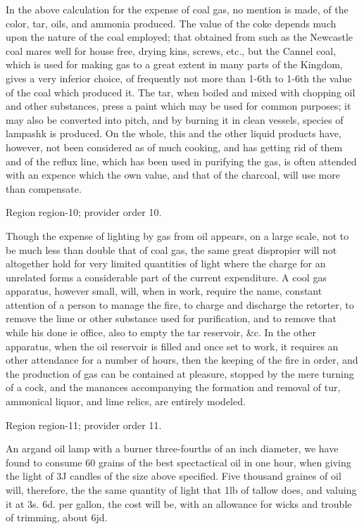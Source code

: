 \documentclass[11pt]{article}
\begin{document}
In the above calculation for the expense of coal gas, no mention is made, of the color, tar, oils, and ammonia produced. The value of the coke depends much upon the nature of the coal employed; that obtained from such as the Newcastle coal mares well for house free, drying kins, screws, etc., but the Cannel coal, which is used for making gas to a great extent in many parts of the Kingdom, gives a very inferior choice, of frequently not more than 1-6th to 1-6th the value of the coal which produced it. The tar, when boiled and mixed with chopping oil and other substances, press a paint which may be used for common purposes; it may also be converted into pitch, and by burning it in clean vessels, species of lampashk is produced. On the whole, this and the other liquid products have, however, not been considered as of much cooking, and has getting rid of them and of the reflux line, which has been used in purifying the gas, is often attended with an expence which the own value, and that of the charcoal, will use more than compensate.
\par

{\scriptsize\color{gray} Region region-10; provider order 10.\par}
\medskip

Though the expense of lighting by gas from oil appears, on a large scale, not to be much less than double that of coal gas, the same great dispropier will not altogether hold for very limited quantities of light where the charge for an unrelated forms a considerable part of the current expenditure. A cool gas apparatus, however small, will, when in work, require the name, constant attention of a person to manage the fire, to charge and discharge the retorter, to remove the lime or other substance used for purification, and to remove that while his done ie office, also to empty the tar reservoir, \&c. In the other apparatus, when the oil reservoir is filled and once set to work, it requires an other attendance for a number of hours, then the keeping of the fire in order, and the production of gas can be contained at pleasure, stopped by the mere turning of a cock, and the manances accompanying the formation and removal of tur, ammonical liquor, and lime relics, are entirely modeled.
\par

{\scriptsize\color{gray} Region region-11; provider order 11.\par}
\medskip

An argand oil lamp with a burner three-fourths of an inch diameter, we have found to consume 60 grains of the best spectactical oil in one hour, when giving the light of 3J candles of the size above specified. Five thousand graines of oil will, therefore, the the same quantity of light that 1lb of tallow does, and valuing it at 3s. 6d. per gallon, the cost will be, with an allowance for wicks and trouble of trimming, about 6jd.
\par
\end{document}
